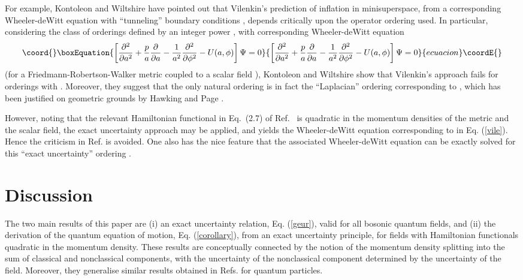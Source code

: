 \documentclass[a4paper,preprint, showpacs, aps, draft]{revtex4}
\begin{document}
{{For example, Kontoleon and Wiltshire \cite{wiltshire} have pointed
out that Vilenkin's prediction of inflation in minisuperspace,
from a corresponding Wheeler-deWitt equation with
``tunneling'' boundary conditions \cite{vilenkin},
depends critically upon the operator ordering used.
In particular, considering the class of orderings defined by an integer
power \coordHE{}, with corresponding
Wheeler-deWitt equation \cite{vilenkin}
\begin{equation}\coord{}\boxEquation{ \label{vile}
\left[\frac{\partial^2}{\partial a^2} +
\frac{p}{a}\frac{\partial}{\partial a} - \frac{1}{a^2}\frac{\partial^2}{
\partial \phi^2} - U(a,\phi)\right]\Psi = 0 
}{ \left[\frac{\partial^2}{\partial a^2} +
\frac{p}{a}\frac{\partial}{\partial a} - \frac{1}{a^2}\frac{\partial^2}{
\partial \phi^2} - U(a,\phi)\right]\Psi = 0 
}{ecuacion}\coordE{}\end{equation}
(for a Friedmann-Robertson-Walker metric coupled to a scalar field \myHighlight{$\phi$}\coordHE{}), 
Kontoleon and Wiltshire show that Vilenkin's approach fails for orderings
with \coordHE{} \cite{wiltshire}.  Moreover, they suggest
that the only natural ordering is in fact the ``Laplacian'' ordering
corresponding to \coordHE{}, which has been justified on geometric grounds by
Hawking and Page \cite{hawking}.  

However, noting that the relevant Hamiltonian functional in Eq.~(2.7) of
Ref.~\cite{vilenkin} is quadratic in the momentum densities of the
metric and the scalar field, the exact uncertainty approach may be
applied, and yields the
Wheeler-deWitt equation corresponding to \coordHE{} in Eq. (\ref{vile}). 
Hence the criticism in Ref. \cite{wiltshire} is avoided.  
One also has the nice feature
that  the associated Wheeler-deWitt equation
can be exactly solved for this ``exact uncertainty'' ordering \cite{vilenkin}.

\section{Discussion}

The two main results of this paper are (i) an exact uncertainty relation,
Eq. (\ref{geur}), valid for all bosonic quantum fields, and (ii) the derivation 
of the
quantum equation of motion, Eq. (\ref{corollary}), from an exact
uncertainty principle, for fields with
Hamiltonian functionals quadratic in the momentum density.
These results are conceptually connected by the
notion of the momentum density splitting into the sum of classical and
nonclassical components, with the uncertainty of the nonclassical
component determined by the uncertainty of the field. Moreover, they 
generalise similar results obtained in Refs. 
\cite{hallfish, eur,hallreg, bamberg} for quantum particles.  

}}
\end{document}
